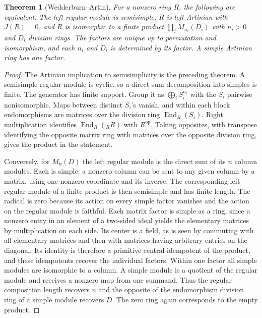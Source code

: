 \documentclass[11pt,oneside,openany]{book}
\newtheorem{theorem}{Theorem}[chapter]
\theoremstyle{definition}
\theoremstyle{remark}
\begin{document}
\begin{theorem}[Wedderburn--Artin]\label{p103:ALG-03-C03-R04}
For a nonzero ring \(R\), the following are equivalent.
The left regular module is semisimple, \(R\) is left Artinian
with \(J(R)=0\), and \(R\) is isomorphic to a finite product
\(\prod_i M_{n_i}(D_i)\) with \(n_i>0\) and \(D_i\) division
rings. The factors are unique up to permutation and
isomorphism, and each \(n_i\) and \(D_i\) is determined by its
factor. A simple Artinian ring has one factor.
\end{theorem}
\begin{proof}
The Artinian implication to semisimplicity is the preceding
theorem. A semisimple regular module is cyclic, so a direct sum
decomposition into simples is finite. The generator has finite
support. Group it as \(\bigoplus_i S_i^{n_i}\) with the \(S_i\)
pairwise nonisomorphic. Maps between distinct \(S_i\)'s vanish,
and within each block endomorphisms are matrices over the division
ring \(\operatorname{End}_R(S_i)\).
Right multiplication identifies \(\operatorname{End}_R({}_R R)\)
with \(R^{\mathrm{op}}\). Taking opposites, with transpose
identifying the opposite matrix ring with matrices over the
opposite division ring, gives the product in the statement.

Conversely, for \(M_n(D)\) the left regular module is the direct
sum of its \(n\) column modules. Each is simple: a nonzero column
can be sent to any given column by a matrix, using one nonzero
coordinate and its inverse. The corresponding left regular
module of a finite product is then semisimple and has finite
length. The radical is zero because its action on every simple
factor vanishes and the action on the regular module is faithful.
Each matrix factor is simple as a ring, since a nonzero entry
in an element of a two-sided ideal yields the elementary
matrices by multiplication on each side. Its center is a field,
as is seen by commuting with all elementary matrices and then
with matrices having arbitrary entries on the diagonal. Its
identity is therefore a primitive central idempotent of the
product, and these idempotents recover the individual factors.
Within one factor all simple modules are isomorphic to a column.
A simple module is a quotient of the regular module and receives
a nonzero map from one summand. Thus the regular composition
length recovers \(n\) and the opposite of the endomorphism
division ring of a simple module recovers \(D\).
The zero ring again corresponds to the empty product.
\end{proof}
\end{document}
